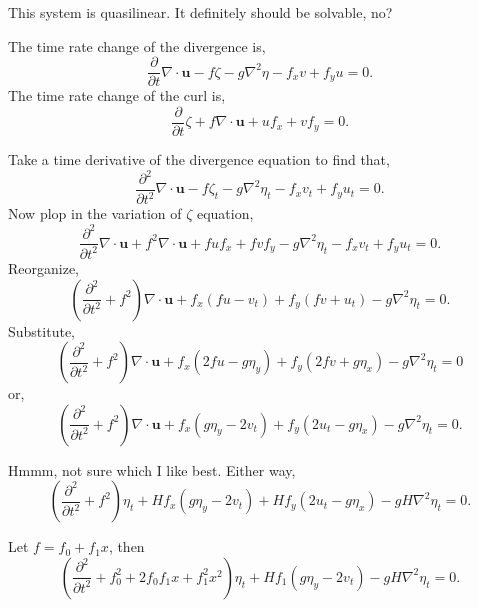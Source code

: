 \documentclass[11pt]{amsart}
\begin{document}
This system is quasilinear. It definitely should be solvable, no?

The time rate change of the divergence is,
\begin{equation}
\frac{\partial }{\partial t} \nabla \cdot \mathbf{u} - f \zeta - g \nabla^2 \eta -f_x v + f_y u = 0.
\end{equation}
The time rate change of the curl is,
\begin{equation}
\frac{\partial }{\partial t} \zeta + f \nabla \cdot \mathbf{u} + u f_x + v f_y  = 0.
\end{equation}

Take a time derivative of the divergence equation to find that,
\begin{equation}
\frac{\partial^2 }{\partial t^2} \nabla \cdot \mathbf{u} - f \zeta_t - g \nabla^2 \eta_t -f_x v_t + f_y u_t = 0.
\end{equation}
Now plop in the variation of $\zeta$ equation,
\begin{equation}
\frac{\partial^2 }{\partial t^2} \nabla \cdot \mathbf{u} + f^2 \nabla \cdot \mathbf{u} + f u f_x + f v f_y - g \nabla^2 \eta_t -f_x v_t + f_y u_t = 0.
\end{equation}
Reorganize,
\begin{equation}
\left( \frac{\partial^2 }{\partial t^2}   + f^2  \right) \nabla \cdot \mathbf{u} +   f_x (f u - v_t) +  f_y ( f v + u_t) - g \nabla^2 \eta_t = 0.
\end{equation}
Substitute,
\begin{equation}
\left( \frac{\partial^2 }{\partial t^2}   + f^2  \right) \nabla \cdot \mathbf{u} +   f_x (2 f u - g \eta_y ) +  f_y ( 2 f v +g \eta_x ) - g \nabla^2 \eta_t = 0
\end{equation}
or,
\begin{equation}
\left( \frac{\partial^2 }{\partial t^2}   + f^2  \right) \nabla \cdot \mathbf{u} +   f_x ( g \eta_y - 2 v_t ) +  f_y ( 2 u_t - g \eta_x ) - g \nabla^2 \eta_t = 0.
\end{equation}

Hmmm, not sure which I like best. Either way,
\begin{equation}
\left( \frac{\partial^2 }{\partial t^2}   + f^2  \right) \eta_t+   H f_x ( g \eta_y - 2 v_t ) +  H f_y ( 2 u_t - g \eta_x ) - g H \nabla^2 \eta_t = 0.
\end{equation}

Let $f = f_0 + f_1 x$, then
\begin{equation}
\left( \frac{\partial^2 }{\partial t^2}   + f_0^2 + 2f_0 f_1 x + f_1^2 x^2  \right) \eta_t+   H f_1 ( g \eta_y - 2 v_t ) - g H \nabla^2 \eta_t = 0.
\end{equation}
\end{document}
